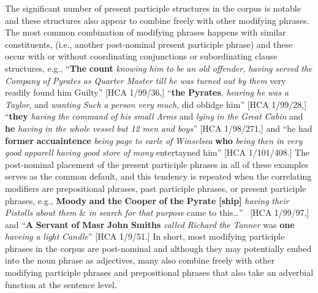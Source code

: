   The significant number of present participle structures in the corpus is notable and these structures also appear to combine freely with other modifying phrases. The most common combination of modifying phrases happens with similar constituents, (i.e., another post-nominal present participle phrase) and these occur with or without coordinating conjunctions or subordinating clause structures, e.g.,  “\textbf{The} \textbf{count} \textit{knowing} \textit{him} \textit{to} \textit{be} \textit{an} \textit{old} \textit{offender,} \textit{having} \textit{served} \textit{the} \textit{Company} \textit{of} \textit{Pyrates} \textit{as} \textit{Quarter} \textit{Master} \textit{till} \textit{he} \textit{was} \textit{turned} \textit{out} \textit{by} \textit{them} very readily found him Guilty” [HCA 1/99/36,] “\textbf{the} \textbf{Pyrates}, \textit{hearing} \textit{he} \textit{was} \textit{a} \textit{Taylor}, and \textit{wanting} \textit{Such} \textit{a} \textit{person} \textit{very} \textit{much}, did oblidge him” [HCA 1/99/28,] “\textbf{they} \textit{having} \textit{the} \textit{command} \textit{of} \textit{his} \textit{small} \textit{Arms} and \textit{lying} \textit{in} \textit{the} \textit{Great} \textit{Cabin} and \textbf{he} \textit{having} \textit{in} \textit{the} \textit{whole} \textit{vessel} \textit{but} \textit{12} \textit{men} \textit{and} \textit{boys}” [HCA 1/98/271,] and “he had \textbf{former} \textbf{accuaintence} \textit{being} \textit{page} \textit{to} \textit{earle} \textit{of} \textit{Winselsea} \textbf{who} \textit{being} \textit{then} \textit{in} \textit{very} \textit{good} \textit{apparell} \textit{having} \textit{good} \textit{store} \textit{of} \textit{mony} entertayned him” [HCA 1/101/408.] The post-nominal placement of the present participle phrases in all of these examples serves as the common default, and this tendency is repeated when the correlating modifiers are prepositional phrases, past participle phrases, or present participle phrases, e.g., \textbf{Moody} \textbf{and} \textbf{the} \textbf{Cooper} \textbf{of} \textbf{the} \textbf{Pyrate} \textbf{[ship]} \textit{having} \textit{their} \textit{Pistolls} \textit{about} \textit{them} \& \textit{in} \textit{search} \textit{for} \textit{that} \textit{purpose} came to this…” ~[HCA 1/99/97,] and “\textbf{A} \textbf{Servant} \textbf{of} \textbf{Masr} \textbf{John} \textbf{Smiths} \textit{called} \textit{Richard} \textit{the} \textit{Tanner} was \textbf{one} \textit{haveing} \textit{a} \textit{light} \textit{Candle}” [HCA 1/9/51.] In short, most modifying participle phrases in the corpus are post-nominal and although they may potentially embed into the noun phrase as adjectives, many also combine freely with other modifying participle phrases and prepositional phrases that also take an adverbial function at the sentence level. 

